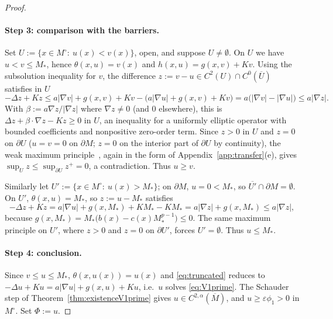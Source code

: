 \documentclass[11pt]{article}
\theoremstyle{plain}
\theoremstyle{definition}
\theoremstyle{remark}
\begin{document}
\begin{proof}
\paragraph{Step 3: comparison with the barriers.}
Set \(U:=\{x\in M^\circ:\ u(x)<v(x)\}\), open, and suppose \(U\ne\emptyset\). On \(U\) we have \(u<v\le M_\ast\), hence \(\theta(x,u)=v(x)\) and \(h(x,u)=g(x,v)+Kv\). Using the subsolution inequality for \(v\), the difference \(z:=v-u\in C^2(U)\cap C^0(\overline U)\) satisfies in \(U\)
\[
-\Delta z+Kz\le a|\nabla v|+g(x,v)+Kv-\big(a|\nabla u|+g(x,v)+Kv\big)=a\big(|\nabla v|-|\nabla u|\big)\le a|\nabla z| .
\]
With \(\beta:=a\nabla z/|\nabla z|\) where \(\nabla z\ne 0\) (and \(0\) elsewhere), this is \(\Delta z+\beta\cdot\nabla z-Kz\ge 0\) in \(U\), an inequality for a uniformly elliptic operator with bounded coefficients and nonpositive zero-order term. Since \(z>0\) in \(U\) and \(z=0\) on \(\partial U\) (\(u=v=0\) on \(\partial M\); \(z=0\) on the interior part of \(\partial U\) by continuity), the weak maximum principle~\cite[Cor.~3.2]{GilbargTrudinger2001}, again in the form of Appendix~\ref{app:transfer}(e), gives \(\sup_U z\le\sup_{\partial U}z^+=0\), a contradiction. Thus \(u\ge v\).

Similarly let \(U':=\{x\in M^\circ:\ u(x)>M_\ast\}\); on \(\partial M\), \(u=0<M_\ast\), so \(\overline{U'}\cap\partial M=\emptyset\). On \(U'\), \(\theta(x,u)=M_\ast\), so \(z:=u-M_\ast\) satisfies
\[
-\Delta z+Kz=a|\nabla u|+g(x,M_\ast)+KM_\ast-KM_\ast=a|\nabla z|+g(x,M_\ast)\le a|\nabla z|,
\]
because \(g(x,M_\ast)=M_\ast\big(b(x)-c(x)M_\ast^{p-1}\big)\le 0\). The same maximum principle on \(U'\), where \(z>0\) and \(z=0\) on \(\partial U'\), forces \(U'=\emptyset\). Thus \(u\le M_\ast\).

\paragraph{Step 4: conclusion.}
Since \(v\le u\le M_\ast\), \(\theta(x,u(x))=u(x)\) and \eqref{eq:truncated} reduces to \(-\Delta u+Ku=a|\nabla u|+g(x,u)+Ku\), i.e.\ \(u\) solves \eqref{eq:V1prime}. The Schauder step of Theorem~\ref{thm:existenceV1prime} gives \(u\in C^{2,\alpha}(\overline M)\), and \(u\ge\varepsilon\phi_1>0\) in \(M^\circ\). Set \(\Phi:=u\).
\end{proof}
\end{document}
